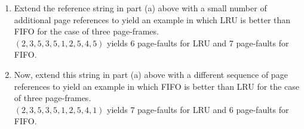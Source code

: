 \documentclass[11pt]{article}
\newcommand{\n}{\vspace{0.3cm}}
\def\rto{\color{red}{\to}\color{black}}
\begin{document}
\begin{enumerate}
\begin{enumerate}
      In this case, the algoritm for LRU and FIFO are actually the exact same
      \[\begin{pmatrix} - \\ - \\ - \end{pmatrix} \rto \begin{pmatrix} 2 \\ - \\ - \end{pmatrix} \rto \begin{pmatrix} 2 \\ 3 \\ - \end{pmatrix} \rto \begin{pmatrix} 2 \\ 3 \\ 5 \end{pmatrix} \to \begin{pmatrix} 2 \\ 3 \\ 5 \end{pmatrix} \to \begin{pmatrix} 2 \\ 3 \\ 5 \end{pmatrix} \rto \begin{pmatrix} 1 \\ 3 \\ 5 \end{pmatrix} \rto \begin{pmatrix} 1 \\ 2 \\ 5 \end{pmatrix}, \;\; \text{so 5 page-faults.}\]

      \item Extend the reference string in part (a) above with a small number of additional page references to yield an example in which LRU is better than FIFO for the case of three page-frames. \n\\
        \((2, 3, 5, 3, 5, 1, 2, 5, 4, 5)\) yields 6 page-faults for LRU and 7 page-faults for FIFO. \n

      \item Now, extend this string in part (a) above with a different sequence of page references to yield an example in which FIFO is better than LRU for the case of three page-frames. \n\\
        \((2, 3, 5, 3, 5, 1, 2, 5, 4, 1)\) yields 7 page-faults for LRU and 6 page-faults for FIFO.
    \end{enumerate} \n


\end{enumerate}
\end{document}
